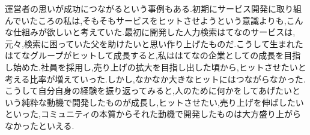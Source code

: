 \documentclass[uplatex,twocolumn,dvipdfmx]{jsarticle}
\begin{document}
運営者の思いが成功につながるという事例もある.初期にサービス開発に取り組んでいたころの私は,そもそもサービスをヒットさせようという意識よりも,こんな仕組みが欲しいと考えていた.最初に開発した人力検索はてなのサービスは,元々,検索に困っていた父を助けたいと思い作り上げたものだ.こうして生まれたはてなグループがヒットして成長すると,私ははてなの企業としての成長を目指し始めた.社員を採用し,売り上げの拡大を目指し出した頃から,ヒットさせたいと考える比率が増えていった.しかし,なかなか大きなヒットにはつながらなかった.こうして自分自身の経験を振り返ってみると,人のために何かをしてあげたいという純粋な動機で開発したものが成長し,ヒットさせたい,売り上げを伸ばしたいといった,コミュニティの本質からそれた動機で開発したものは大方盛り上がらなかったといえる.



\end{document}
